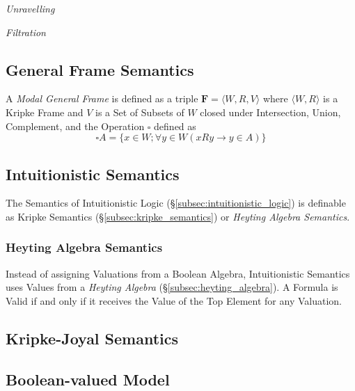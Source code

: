 \documentclass{article}
\begin{document}

\emph{Unravelling}

\emph{Filtration}

\subsection{General Frame Semantics}

A \emph{Modal General Frame} is defined as a triple $\mathbf{F} =
\langle W,R,V \rangle$ where $\langle W,R \rangle$ is a Kripke Frame
and $V$ is a Set of Subsets of $W$ closed under Intersection, Union,
Complement, and the Operation $\square$ defined as
\[
    \square A = \{x \in W; \forall y \in W ( x R y \rightarrow y \in A ) \}
\]

\subsection{Intuitionistic Semantics}

The Semantics of Intuitionistic Logic
(\S\ref{subsec:intuitionistic_logic}) is definable as Kripke Semantics
(\S\ref{subsec:kripke_semantics}) or \emph{Heyting Algebra Semantics}.

\subsubsection{Heyting Algebra Semantics}\label{subsec:heyting_semantics}

Instead of assigning Valuations from a Boolean Algebra, Intuitionistic
Semantics uses Values from a \emph{Heyting Algebra}
(\S\ref{subsec:heyting_algebra}). A Formula is Valid if and only if it
receives the Value of the Top Element for any Valuation.

\subsection{Kripke-Joyal Semantics}

\subsection{Boolean-valued Model}
\end{document}
